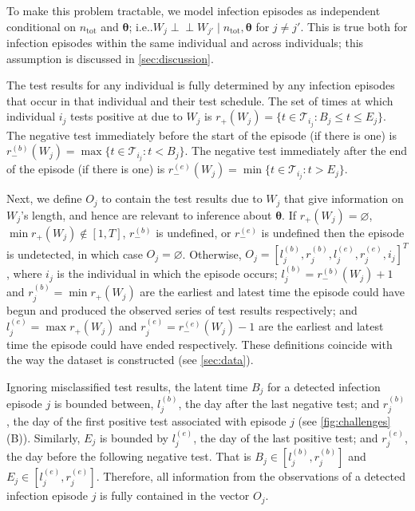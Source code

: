 \documentclass[12pt]{article}
\makeatletter
\newcommand{\ind}{\mathrel{\perp\!\!\!\perp}}
\renewcommand{\vec}[1]{\bm{#1}}
\newcommand{\ssep}{:}
\newcommand{\ntot}{n_\text{tot}}
\newcommand{\sched}{\mathcal{T}}
\newcommand{\posResults}{r_{+}}
\newcommand{\negResults}{r_{-}}
\DeclareRobustCommand\onedot{\futurelet\@let@token\@onedot}
\def\@onedot{\ifx\@let@token.\else.\null\fi\xspace}
\def\ie{i.e\onedot} \def\Ie{{I.e}\onedot}
\makeatother
\begin{document}
To make this problem tractable, we model infection episodes as independent conditional on $\ntot$ and $\vec{\theta}$; \ie $W_j \ind W_{j'} \mid \ntot, \vec{\theta}$ for $j \neq j'$.
This is true both for infection episodes within the same individual and across individuals; this assumption is discussed in \cref{sec:discussion}.

The test results for any individual is fully determined by any infection episodes that occur in that individual and their test schedule.
The set of times at which individual $i_j$ tests positive at due to $W_j$ is $\posResults(W_j) = \{ t \in \sched_{i_j} \ssep B_j \leq t \leq E_j \}$.
The negative test immediately before the start of the episode (if there is one) is $\negResults^{(b)}(W_j) = \max \{ t \in \sched_{i_j} \ssep t < B_j \}$.
The negative test immediately after the end of the episode (if there is one) is $\negResults^{(e)}(W_j) = \min \{ t \in \sched_{i_j} \ssep t > E_j \}$.

Next, we define $O_j$ to contain the test results due to $W_j$ that give information on $W_j$'s length, and hence are relevant to inference about $\vec{\theta}$.
If $\posResults(W_j) = \varnothing$, $\min \posResults(W_j) \notin [1, T]$, $\negResults^{(b)}$ is undefined, or $\negResults^{(e)}$ is undefined then the episode is undetected, in which case $O_j = \varnothing$.
Otherwise, $O_j = [l_j^{(b)}, r_j^{(b)}, l_j^{(e)}, r_j^{(e)}, i_j]^T$, where $i_j$ is the individual in which the episode occurs; $l_j^{(b)} = \negResults^{(b)}(W_j) + 1$ and $r_j^{(b)} = \min \posResults(W_j)$ are the earliest and latest time the episode could have begun and produced the observed series of test results respectively; and $l_j^{(e)} = \max \posResults(W_j)$ and $r_j^{(e)} = \negResults^{(e)}(W_j) - 1$ are the earliest and latest time the episode could have ended respectively.
These definitions coincide with the way the dataset is constructed (see \cref{sec:data}).

Ignoring misclassified test results, the latent time $B_j$ for a detected infection episode $j$ is bounded between, $l_j^{(b)}$, the day after the last negative test; and $r_j^{(b)}$, the day of the first positive test associated with episode $j$ (see \cref{fig:challenges}(B)).
Similarly, $E_j$ is bounded by $l_j^{(e)}$, the day of the last positive test; and $r_j^{(e)}$, the day before the following negative test.
That is $B_j \in [l_j^{(b)}, r_j^{(b)}]$ and $E_j \in [l_j^{(e)}, r_j^{(e)}]$.
Therefore, all information from the observations of a detected infection episode $j$ is fully contained in the vector $O_j$.
\end{document}
